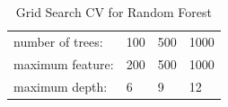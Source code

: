 \documentclass[11pt,oneside,a4paper]{article}
\numberwithin{equation}{section}
\begin{document}
\begin{table}[ht]
\centering
\small
\caption{Grid Search CV for Random Forest}
\label{cv:rf}
\begin{tabular}{llll}
\toprule
number of trees: & 100 & 500 & 1000 \\
maximum feature:     &200  & 500 & 1000   \\
maximum depth:    & 6   & 9   & 12  \\
\bottomrule
\end{tabular}
\end{table}
\end{document}
